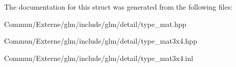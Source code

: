 The documentation for this struct was generated from the following files\+:\begin{DoxyCompactItemize}
\item 
Commun/\+Externe/glm/include/glm/detail/type\+\_\+mat.\+hpp\item 
Commun/\+Externe/glm/include/glm/detail/type\+\_\+mat3x4.\+hpp\item 
Commun/\+Externe/glm/include/glm/detail/type\+\_\+mat3x4.\+inl\end{DoxyCompactItemize}
